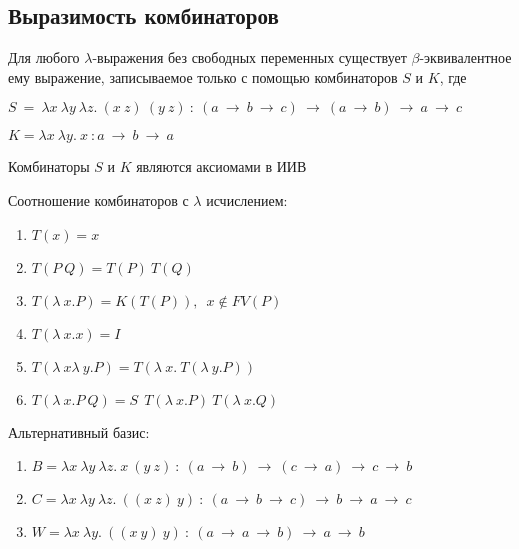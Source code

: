 	 \subsection{Выразимость комбинаторов}
	 \begin{statement}Для любого $\lambda$-выражения без свободных переменных существует $\beta$-эквивалентное ему выражение, записываемое только с помощью комбинаторов $S$ и $K$, где\end{statement}
	 $S\:=\:\lambda x\:\lambda y\:\lambda z.\:(x\:z)\:(y\:z)\: : \:(a\:\rightarrow\:b\:\rightarrow\:c)\:\rightarrow\:(a\:\rightarrow\:b)\:\rightarrow\:a\:\rightarrow\:c$\par 
	 $K=\lambda x\:\lambda y.\:x\: : a\:\rightarrow\:b\:\rightarrow\:a$\par 
	 \begin{statement}Комбинаторы $S$ и $K$ являются аксиомами в ИИВ\end{statement}
	\begin{statement}Соотношение комбинаторов с $\lambda$ исчислением:\end{statement}
	\begin{enumerate}
		\item $T(x)=x$
		\item $T(P\:Q)=T(P)\:T(Q)$
		\item $T(\lambda\:x.P)=K(T(P)),\enspace x\not\in FV(P)$
		\item $T(\lambda\:x.x)=I$
		\item $T(\lambda\:x\lambda\:y.P)=T(\lambda\:x.\:T(\lambda\:y.P))$
		\item $T(\lambda\:x.P\:Q)=S\:\:T(\lambda\:x.P)\:T(\lambda\:x.Q)$
	\end{enumerate}
	\begin{statement}Альтернативный базис:\end{statement}
	 \begin{enumerate}
		\item $B=\lambda x\:\lambda y\:\lambda z.\:x\:(y\:z)\: : \:(a\:\rightarrow\:b)\:\rightarrow\:(c\:\rightarrow\:a)\:\rightarrow\:c\:\rightarrow\:b$
		\item $C=\lambda x\:\lambda y\:\lambda z.\:((x\:z)\:y)\: : \:(a\:\rightarrow\:b\:\rightarrow\:c)\:\rightarrow\:b\:\rightarrow\:a\:\rightarrow\:c$
		\item $W=\lambda x\:\lambda y.\:((x\:y)\:y)\: : \: (a\:\rightarrow\:a\:\rightarrow\:b)\:\rightarrow\:a\:\rightarrow\:b$
		\\\\\\
	 \end{enumerate}
